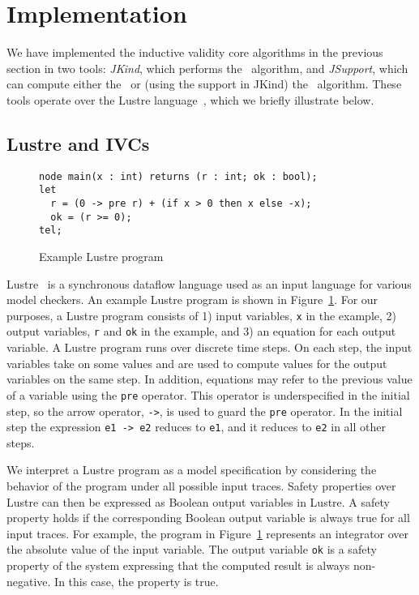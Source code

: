 \section{Implementation}
\label{sec:impl}

We have implemented the inductive validity core algorithms in the previous section in two tools: {\em JKind}, which performs the \ucalg\ algorithm, and {\em JSupport}, which can compute either the \bfalg\ or (using the support in JKind) the \ucbfalg\ algorithm.  These tools operate over the Lustre language~\cite{Halbwachs91:lustre}, which we briefly illustrate below.

\subsection{Lustre and IVCs}

\begin{figure}[t]
{\small
\begin{verbatim}
node main(x : int) returns (r : int; ok : bool);
let
  r = (0 -> pre r) + (if x > 0 then x else -x);
  ok = (r >= 0);
tel;
\end{verbatim}
}
  \caption{Example Lustre program}
  \label{fig:lustre-ex}
\end{figure}

Lustre~\cite{Halbwachs91:lustre} is a synchronous dataflow language used as an input language for various model checkers. An example Lustre program is shown in
Figure~\ref{fig:lustre-ex}. For our purposes, a Lustre program
consists of 1) input variables, {\tt x} in the example, 2) 
output variables, {\tt r} and {\tt ok} in the example, and 3) an
equation for each output variable. A Lustre program runs over discrete
time steps. On each step, the input variables take on some values and
are used to compute values for the output variables on the same step.
In addition, equations may refer to the previous value of a variable
using the {\tt pre} operator. This operator is underspecified in the
initial step, so the arrow operator, {\tt ->}, is used to guard the
{\tt pre} operator. In the initial step the expression {\tt e1 -> e2}
reduces to {\tt e1}, and it reduces to {\tt e2} in all other steps.

We interpret a Lustre program as a model specification by considering
the behavior of the program under all possible input traces. Safety
properties over Lustre can then be expressed as Boolean output
variables in Lustre. A safety property holds if the corresponding
Boolean output variable is always true for all input traces. For
example, the program in Figure~\ref{fig:lustre-ex} represents an
integrator over the absolute value of the input variable. The output
variable {\tt ok} is a safety property of the system expressing that
the computed result is always non-negative. In this case, the property
is true.

